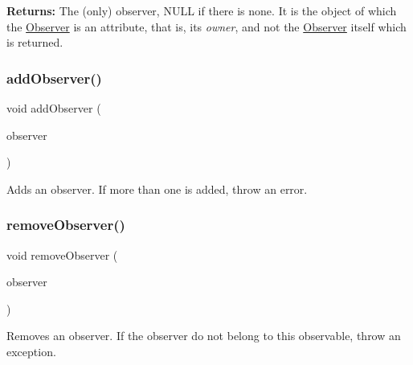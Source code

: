 {\bfseries Returns\+:} The (only) observer, {\ttfamily N\+U\+LL} if there is none. It is the object of which the \hyperlink{classKatabatic_1_1Observer}{Observer} is an attribute, that is, it\textquotesingle{}s {\itshape owner}, and not the \hyperlink{classKatabatic_1_1Observer}{Observer} itself which is returned. \mbox{\label{classKatabatic_1_1Observable_a783fda85eeabe9c660881f236f162767}} 
\subsubsection{\texorpdfstring{add\+Observer()}{addObserver()}}
{\footnotesize\ttfamily void add\+Observer (\begin{DoxyParamCaption}\item[{\hyperlink{classKatabatic_1_1BaseObserver}{Base\+Observer} $\ast$}]{observer }\end{DoxyParamCaption})\hspace{0.3cm}{\ttfamily [inline]}}

Adds an observer. If more than one is added, throw an error. \mbox{\label{classKatabatic_1_1Observable_acaa5a7fc7fa631e3006a42006d753f43}} 
\subsubsection{\texorpdfstring{remove\+Observer()}{removeObserver()}}
{\footnotesize\ttfamily void remove\+Observer (\begin{DoxyParamCaption}\item[{\hyperlink{classKatabatic_1_1BaseObserver}{Base\+Observer} $\ast$}]{observer }\end{DoxyParamCaption})\hspace{0.3cm}{\ttfamily [inline]}}

Removes an observer. If the observer do not belong to this observable, throw an exception. \mbox{\label{classKatabatic_1_1Observable_a52e577fb0c4f2e3650928334fb621c2f}} 
